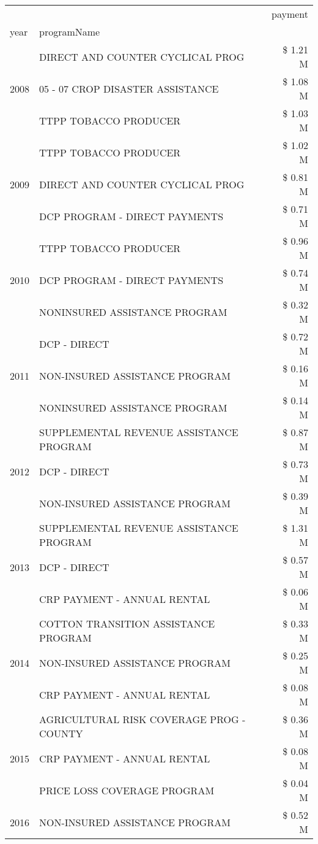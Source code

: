 \begin{tabular}{llr}
\toprule
 &  & payment \\
year & programName &  \\
\midrule
\multirow[t]{3}{*}{2008} & DIRECT AND COUNTER CYCLICAL PROG & \$ 1.21 M \\
 & 05 - 07 CROP DISASTER ASSISTANCE & \$ 1.08 M \\
 & TTPP TOBACCO PRODUCER & \$ 1.03 M \\
\cline{1-3}
\multirow[t]{3}{*}{2009} & TTPP TOBACCO PRODUCER & \$ 1.02 M \\
 & DIRECT AND COUNTER CYCLICAL PROG & \$ 0.81 M \\
 & DCP PROGRAM - DIRECT PAYMENTS & \$ 0.71 M \\
\cline{1-3}
\multirow[t]{3}{*}{2010} & TTPP TOBACCO PRODUCER & \$ 0.96 M \\
 & DCP PROGRAM - DIRECT PAYMENTS & \$ 0.74 M \\
 & NONINSURED ASSISTANCE PROGRAM & \$ 0.32 M \\
\cline{1-3}
\multirow[t]{3}{*}{2011} & DCP - DIRECT & \$ 0.72 M \\
 & NON-INSURED ASSISTANCE PROGRAM & \$ 0.16 M \\
 & NONINSURED ASSISTANCE PROGRAM & \$ 0.14 M \\
\cline{1-3}
\multirow[t]{3}{*}{2012} & SUPPLEMENTAL REVENUE ASSISTANCE PROGRAM & \$ 0.87 M \\
 & DCP - DIRECT & \$ 0.73 M \\
 & NON-INSURED ASSISTANCE PROGRAM & \$ 0.39 M \\
\cline{1-3}
\multirow[t]{3}{*}{2013} & SUPPLEMENTAL REVENUE ASSISTANCE PROGRAM & \$ 1.31 M \\
 & DCP - DIRECT & \$ 0.57 M \\
 & CRP PAYMENT - ANNUAL RENTAL & \$ 0.06 M \\
\cline{1-3}
\multirow[t]{3}{*}{2014} & COTTON TRANSITION ASSISTANCE PROGRAM & \$ 0.33 M \\
 & NON-INSURED ASSISTANCE PROGRAM & \$ 0.25 M \\
 & CRP PAYMENT - ANNUAL RENTAL & \$ 0.08 M \\
\cline{1-3}
\multirow[t]{3}{*}{2015} & AGRICULTURAL RISK COVERAGE PROG - COUNTY & \$ 0.36 M \\
 & CRP PAYMENT - ANNUAL RENTAL & \$ 0.08 M \\
 & PRICE LOSS COVERAGE PROGRAM & \$ 0.04 M \\
\cline{1-3}
\multirow[t]{3}{*}{2016} & NON-INSURED ASSISTANCE PROGRAM & \$ 0.52 M \\

\end{tabular}
